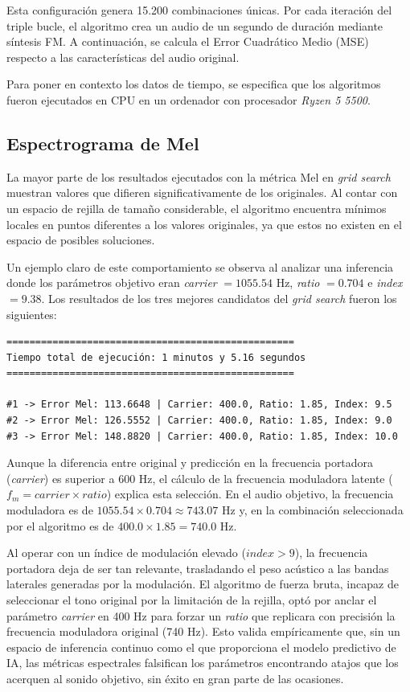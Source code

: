 Esta configuración genera 15.200 combinaciones únicas. Por cada iteración del triple bucle, el algoritmo crea un audio de un segundo de duración mediante síntesis FM. A continuación, se calcula el Error 
Cuadrático Medio (MSE) respecto a las características del audio original.

Para poner en contexto los datos de tiempo, se especifica que los algoritmos fueron ejecutados en CPU en un ordenador con procesador \textit{Ryzen 5 5500}.


\subsection{Espectrograma de Mel}
La mayor parte de los resultados ejecutados con la métrica Mel en \textit{grid search} muestran valores que difieren
significativamente de los originales. Al contar con un espacio de rejilla de tamaño considerable, el algoritmo encuentra mínimos locales en puntos diferentes a los valores originales, ya que estos no existen en el espacio de posibles soluciones.

Un ejemplo claro de este comportamiento se observa al analizar una inferencia donde los parámetros objetivo eran \textit{carrier} $= 1055.54$ Hz, 
\textit{ratio} $= 0.704$ e \textit{index} $= 9.38$. Los resultados de los tres mejores candidatos del \textit{grid search} fueron los siguientes:

\begin{verbatim}
==================================================
Tiempo total de ejecución: 1 minutos y 5.16 segundos
==================================================

#1 -> Error Mel: 113.6648 | Carrier: 400.0, Ratio: 1.85, Index: 9.5
#2 -> Error Mel: 126.5552 | Carrier: 400.0, Ratio: 1.85, Index: 9.0
#3 -> Error Mel: 148.8820 | Carrier: 400.0, Ratio: 1.85, Index: 10.0
\end{verbatim}

Aunque la diferencia entre original y predicción en la frecuencia portadora (\textit{carrier}) es superior a 600 Hz, el cálculo de la frecuencia moduladora
latente ($f_m = carrier \times ratio$) explica esta selección. En el audio objetivo, la frecuencia moduladora es de $1055.54 \times 0.704 \approx 743.07$ Hz y, en la combinación seleccionada por el algoritmo es de $400.0 \times 1.85 = 740.0$ Hz.

Al operar con un índice de modulación elevado ($index > 9$), la frecuencia portadora deja de ser tan relevante,
trasladando el peso acústico a las bandas laterales generadas por la modulación. El algoritmo de fuerza bruta, incapaz de seleccionar el tono original por la 
limitación de la rejilla, optó por anclar el parámetro \textit{carrier} en 400 Hz para forzar un \textit{ratio} que replicara con precisión la frecuencia moduladora 
original (740 Hz). Esto valida empíricamente que, sin un espacio de inferencia continuo como el que proporciona el modelo predictivo de IA, las métricas espectrales falsifican los parámetros encontrando atajos que los acerquen al sonido objetivo, sin éxito en gran parte de las ocasiones.

